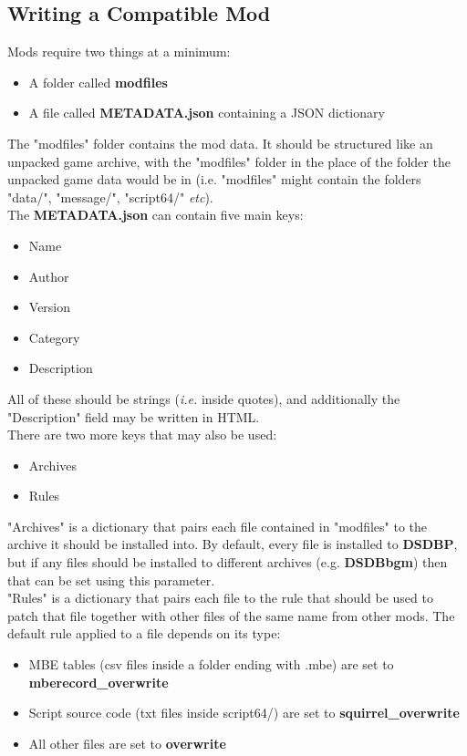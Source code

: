 \documentclass{article}
\begin{document}
\subsection{Writing a Compatible Mod}
Mods require two things at a minimum:
\begin{itemize}
\item A folder called \textbf{modfiles}
\item A file called \textbf{METADATA.json} containing a JSON dictionary
\end{itemize}
The "modfiles" folder contains the mod data. It should be structured like an unpacked game archive, with the "modfiles" folder in the place of the folder the unpacked game data would be in (i.e. "modfiles" might contain the folders "data/", "message/", "script64/" \textit{etc}).\\
The \textbf{METADATA.json} can contain five main keys:
\begin{itemize}
\item Name
\item Author
\item Version
\item Category
\item Description
\end{itemize}
All of these should be strings (\textit{i.e.} inside quotes), and additionally the "Description" field may be written in HTML.\\
There are two more keys that may also be used:
\begin{itemize}
\item Archives
\item Rules
\end{itemize}
"Archives" is a dictionary that pairs each file contained in "modfiles" to the archive it should be installed into. By default, every file is installed to \textbf{DSDBP}, but if any files should be installed to different archives (e.g. \textbf{DSDBbgm}) then that can be set using this parameter.\\
"Rules" is a dictionary that pairs each file to the rule that should be used to patch that file together with other files of the same name from other mods. The default rule applied to a file depends on its type:
\begin{itemize}
\item MBE tables (csv files inside a folder ending with .mbe) are set to \textbf{mberecord\_overwrite}
\item Script source code (txt files inside script64/) are set to \textbf{squirrel\_overwrite}
\item All other files are set to \textbf{overwrite}
\end{itemize}
\end{document}
